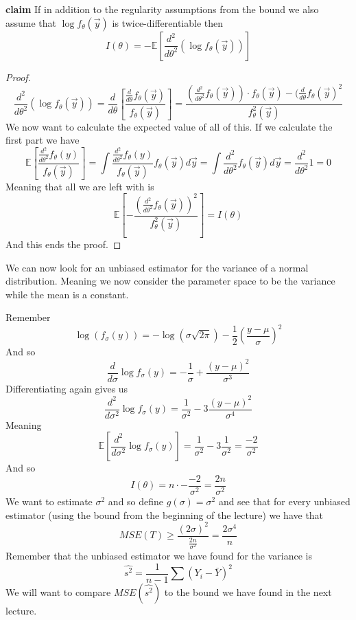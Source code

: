 \documentclass[../main.tex]{subfiles}
\begin{document}
\textbf{claim}
If in addition to the regularity assumptions from the bound we also assume that $\log f_\theta(\overrightarrow{y})$ is twice-differentiable then
\[I(\theta) = -\mathbb{E}\left[\frac{d^2}{d\theta^2}(\log f_\theta(\overrightarrow{y}))\right]\]
\begin{proof}
\[\frac{d^2}{d\theta^2}\left(\log f_\theta(\overrightarrow{y})\right) = \frac{d}{d\theta} \left[\frac{\frac{d}{d\theta} f_\theta(\overrightarrow{y})}{f_\theta(\overrightarrow{y})}\right] = \frac{(\frac{d^2}{d\theta^2} f_\theta(\overrightarrow{y}))\cdot f_\theta(\overrightarrow{y}) - (\frac{d}{d\theta} f_\theta(\overrightarrow{y})^2 }{f_\theta^2(\overrightarrow{y})}\]
We now want to calculate the expected value of all of this. If we calculate the first part we have
\[\mathbb{E}\left[\frac{\frac{d^2}{d\theta^2} f_\theta(y)}{f_\theta(\overrightarrow{y})}\right] = \int \frac{\frac{d^2}{d\theta^2} f_\theta(y)}{f_\theta(\overrightarrow{y})} f_\theta(\overrightarrow{y}) d\overrightarrow{y} = \int \frac{d^2}{d\theta^2} f_\theta(\overrightarrow{y}) d\overrightarrow{y} = \frac{d^2}{d\theta^2} 1 = 0\]
Meaning that all we are left with is
\[\mathbb{E}\left[-\frac{(\frac{d^2}{d\theta^2} f_\theta(\overrightarrow{y}) )^2}{f_\theta^2(\overrightarrow{y})}\right] = I(\theta)\]
And this ends the proof.
\end{proof}
\newpage
\begin{example}
We can now look for an unbiased estimator for the variance of a normal distribution. Meaning we now consider the parameter space to be the variance while the mean is a constant. 
\end{example}
Remember 
\[\log(f_\sigma(y)) = -\log(\sigma\sqrt{2\pi}) - \frac{1}{2} \left(\frac{y-\mu}{\sigma}\right)^2\]
And so 
\[\frac{d}{d\sigma} \log f_\sigma(y) = -\frac{1}{\sigma} + \frac{(y-\mu)^2}{\sigma^3}\]
Differentiating again gives us 
\[\frac{d^2}{d\sigma^2} \log f_\sigma(y) = \frac{1}{\sigma^2} -3\frac{(y-\mu)^2}{\sigma^4}\]
Meaning 
\[\mathbb{E}\left[\frac{d^2}{d\sigma^2} \log f_\sigma(y)\right] = \frac{1}{\sigma^2} - 3\frac{1}{\sigma^2} = \frac{-2}{\sigma^2}\]
And so 
\[I(\theta) = n\cdot-\frac{-2}{\sigma^2} = \frac{2n}{\sigma^2}\]
We want to estimate $\sigma^2$ and so define $g(\sigma) = \sigma^2$ and see that for every unbiased estimator (using the bound from the beginning of the lecture) we have that
\[MSE(T)\geq \frac{(2\sigma)^2}{\frac{2n}{\sigma^2}} = \frac{2\sigma^4}{n}\]
Remember that the unbiased estimator we have found for the variance is
\[\hat{s^2} = \frac{1}{n-1}\sum (Y_i-\bar{Y})^2\]
We will want to compare $MSE(\hat{s^2})$ to the bound we have found in the next lecture. 
\end{document}
